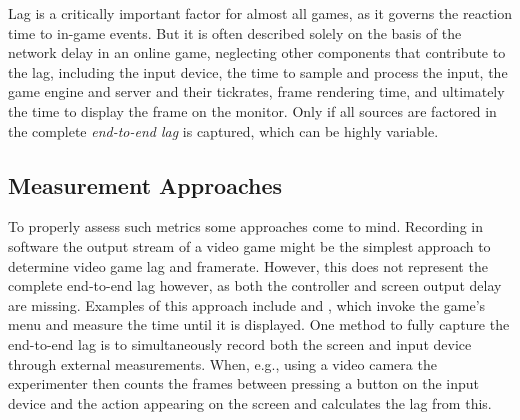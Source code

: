 Lag is a critically important factor for almost all games, as it governs the reaction time to in-game events. But it is often described solely on the basis of the network delay in an online game, neglecting other components that contribute to the lag, including the input device, the time to sample and process the input, the game engine and server and their tickrates, frame rendering time, and ultimately the time to display the frame on the monitor. Only if all sources are factored in the complete \textit{end-to-end lag} is captured, which can be highly variable.




\subsection{Measurement Approaches}
\label{sec:measurementapproaches}

To properly assess such metrics some approaches come to mind. Recording in software the output stream of a video game might be the simplest approach to determine video game lag and framerate. However, this does not represent the complete end-to-end lag however, as both the controller and screen output delay are missing. Examples of this approach include \cite{Chen:2011:MLC:2072298.2071991} and \cite{6670099}, which invoke the game's menu and measure the time until it is displayed. One method to fully capture the end-to-end lag is to simultaneously record both the screen and input device through external measurements. When, e.g., using a video camera the experimenter then counts the frames between pressing a button on the input device and the action appearing on the screen and calculates the lag from this.


